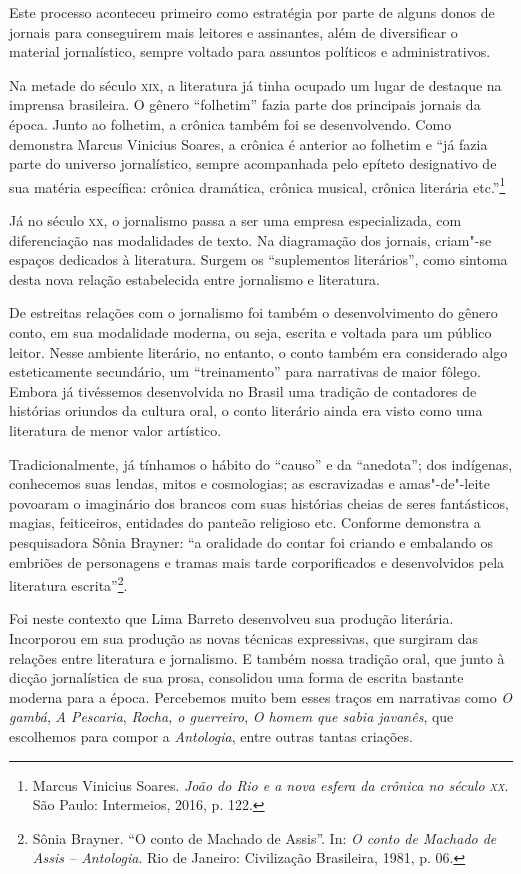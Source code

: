 \documentclass[11pt]{extarticle}
\begin{document}
{{Este processo aconteceu primeiro como estratégia por parte de alguns
donos de jornais para conseguirem mais leitores e assinantes, além de
diversificar o material jornalístico, sempre voltado para assuntos
políticos e administrativos.

Na metade do século \textsc{xix}, a literatura já tinha ocupado um lugar de
destaque na imprensa brasileira. O gênero ``folhetim'' fazia parte dos
principais jornais da época. Junto ao folhetim, a crônica também foi se
desenvolvendo. Como demonstra Marcus Vinicius Soares, a crônica é
anterior ao folhetim e ``já fazia parte do universo jornalístico, sempre
acompanhada pelo epíteto designativo de sua matéria específica: crônica
dramática, crônica musical, crônica literária etc.''\footnote{Marcus
  Vinicius Soares. \emph{João do Rio e a nova esfera da crônica no
  século \textsc{xx}}. São Paulo: Intermeios, 2016, p. 122.}

Já no século \textsc{xx}, o jornalismo passa a ser uma empresa especializada, com
diferenciação nas modalidades de texto. Na diagramação dos jornais,
criam"-se espaços dedicados à literatura. Surgem os ``suplementos
literários'', como sintoma desta nova relação estabelecida entre
jornalismo e literatura.

De estreitas relações com o jornalismo foi também o desenvolvimento do
gênero conto, em sua modalidade moderna, ou seja, escrita e voltada para
um público leitor. Nesse ambiente literário, no entanto, o conto também
era considerado algo esteticamente secundário, um ``treinamento'' para
narrativas de maior fôlego. Embora já tivéssemos desenvolvida no Brasil
uma tradição de contadores de histórias oriundos da cultura oral, o
conto literário ainda era visto como uma literatura de menor valor
artístico.

Tradicionalmente, já tínhamos o hábito do ``causo'' e da ``anedota''; dos
indígenas, conhecemos suas lendas, mitos e cosmologias; as escravizadas e
amas"-de"-leite povoaram o imaginário dos brancos com suas histórias
cheias de seres fantásticos, magias, feiticeiros, entidades do panteão
religioso etc. Conforme demonstra a pesquisadora Sônia Brayner: ``a
oralidade do contar foi criando e embalando os embriões de personagens e
tramas mais tarde corporificados e desenvolvidos pela literatura
escrita''\footnote{Sônia Brayner. ``O conto de Machado de Assis''. In:
  \emph{O conto de Machado de Assis -- Antologia}. Rio de Janeiro:
  Civilização Brasileira, 1981, p. 06.}.

Foi neste contexto que Lima Barreto desenvolveu sua produção literária.
Incorporou em sua produção as novas técnicas expressivas, que surgiram
das relações entre literatura e jornalismo. E também nossa tradição
oral, que junto à dicção jornalística de sua prosa, consolidou uma forma
de escrita bastante moderna para a época. Percebemos muito bem esses
traços em narrativas como {\textit{O gambá}}, {\textit{A
Pescaria}}, {\textit{Rocha, o guerreiro}}, {\textit{O homem
que sabia javanês}}, que escolhemos para compor a \emph{Antologia},
entre outras tantas criações.

}}
\end{document}
